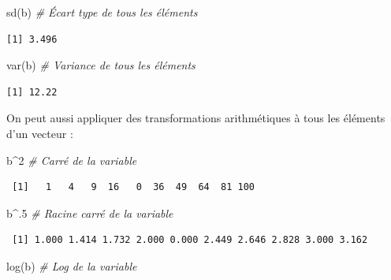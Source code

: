 \documentclass[
  12pt,
]{book}
\newenvironment{Shaded}{\begin{snugshade}}{\end{snugshade}}
\newcommand{\CommentTok}[1]{\textcolor[rgb]{0.56,0.35,0.01}{\textit{#1}}}
\newcommand{\DecValTok}[1]{\textcolor[rgb]{0.00,0.00,0.81}{#1}}
\newcommand{\FunctionTok}[1]{\textcolor[rgb]{0.00,0.00,0.00}{#1}}
\newcommand{\NormalTok}[1]{#1}
\newcommand{\SpecialCharTok}[1]{\textcolor[rgb]{0.00,0.00,0.00}{#1}}
\begin{document}
\begin{Shaded}
\begin{Highlighting}[]
\FunctionTok{sd}\NormalTok{(b) }\CommentTok{\# Écart type de tous les éléments}
\end{Highlighting}
\end{Shaded}

\begin{verbatim}
[1] 3.496
\end{verbatim}

\begin{Shaded}
\begin{Highlighting}[]
\FunctionTok{var}\NormalTok{(b) }\CommentTok{\# Variance de tous les éléments}
\end{Highlighting}
\end{Shaded}

\begin{verbatim}
[1] 12.22
\end{verbatim}

On peut aussi appliquer des transformations arithmétiques à tous les éléments d'un vecteur :

\begin{Shaded}
\begin{Highlighting}[]
\NormalTok{b}\SpecialCharTok{\^{}}\DecValTok{2} \CommentTok{\# Carré de la variable}
\end{Highlighting}
\end{Shaded}

\begin{verbatim}
 [1]   1   4   9  16   0  36  49  64  81 100
\end{verbatim}

\begin{Shaded}
\begin{Highlighting}[]
\NormalTok{b}\SpecialCharTok{\^{}}\NormalTok{.}\DecValTok{5} \CommentTok{\# Racine carré de la variable}
\end{Highlighting}
\end{Shaded}

\begin{verbatim}
 [1] 1.000 1.414 1.732 2.000 0.000 2.449 2.646 2.828 3.000 3.162
\end{verbatim}

\begin{Shaded}
\begin{Highlighting}[]
\FunctionTok{log}\NormalTok{(b) }\CommentTok{\# Log de la variable}
\end{Highlighting}
\end{Shaded}
\end{document}
